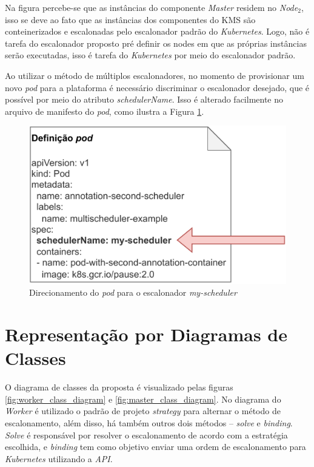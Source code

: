 Na figura percebe-se que as instâncias do componente \textit{Master} residem no \textit{Node$_2$}, isso se deve ao fato que as instâncias dos componentes do \ac{KMS} são conteinerizados e escalonadas pelo escalonador padrão do \textit{Kubernetes}. Logo, não é tarefa do escalonador proposto pré definir os nodes em que as próprias instâncias serão executadas, isso é tarefa do \textit{Kubernetes} por meio do escalonador padrão.

Ao utilizar o método de múltiplos escalonadores, no momento de provisionar um novo \textit{pod} para a plataforma é necessário discriminar o escalonador desejado, que é possível por meio do atributo \textit{schedulerName}. Isso é alterado facilmente no arquivo de manifesto do \textit{pod}, como ilustra a Figura \ref{fig:pod_custom_scheduler}.

\begin{figure}[h!]
	\caption{\label{fig:pod_custom_scheduler}Direcionamento do \textit{pod} para o escalonador \textit{my-scheduler}}
	\centering
	\includegraphics[width=0.6\linewidth]{assets/pod-custom-scheduler.pdf}
\end{figure}

\newpage
\section{Representação por Diagramas de Classes}

O diagrama de classes da proposta é visualizado pelas figuras \ref{fig:worker_class_diagram} e \ref{fig:master_class_diagram}. No diagrama do \textit{Worker} é utilizado o padrão de projeto \textit{strategy} para alternar o método de escalonamento, além disso, há também outros dois métodos -- \textit{solve} e \textit{binding}. \textit{Solve} é responsável por resolver o escalonamento de acordo com a estratégia escolhida, e \textit{binding} tem como objetivo enviar uma ordem de escalonamento para \textit{Kubernetes} utilizando a \textit{API}.


